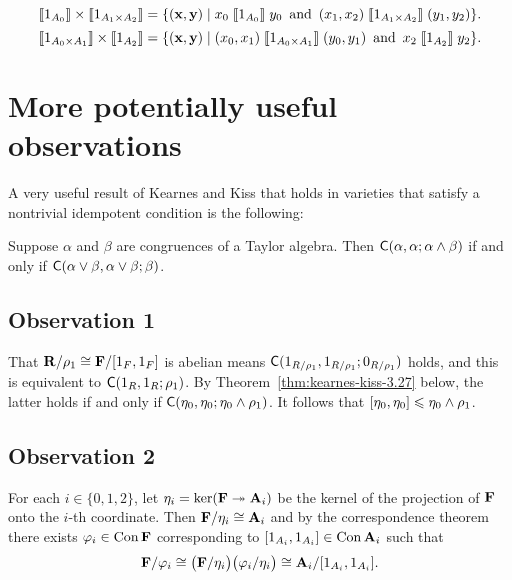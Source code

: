 \medskip

\[
\llbracket 1_{A_0} \rrbracket \times \llbracket 1_{A_1\times A_2} \rrbracket = 
\{(\mathbf{x}, \mathbf{y}) \mid x_0 \mathrel{\llbracket 1_{A_0} \rrbracket} y_0 \, \text{ and } \, 
(x_1, x_2) \mathrel{\llbracket 1_{A_1\times A_2} \rrbracket} (y_1, y_2)\}.
\]
\[
\llbracket 1_{A_0\times A_1} \rrbracket \times\llbracket 1_{A_2} \rrbracket = 
\{(\mathbf{x}, \mathbf{y}) \mid  
(x_0, x_1) \mathrel{\llbracket 1_{A_0\times A_1} \rrbracket} (y_0, y_1)\, \text{ and } \, x_2 \mathrel{\llbracket 1_{A_2} \rrbracket} y_2 
\}.
\]

\bigskip

\bigskip

\section{More potentially useful observations}
A very useful result of Kearnes and Kiss that holds in varieties that satisfy a
nontrivial idempotent \malcev condition is the following:
\begin{theorem} 
  \label{thm:kearnes-kiss-3.27}
  Suppose $\alpha$ and $\beta$ are congruences of a Taylor algebra. Then
  $\mathsf{C}(\alpha,  \alpha;  \alpha \wedge \beta)$ if and only if
  $\mathsf{C}(\alpha \vee \beta,  \alpha \vee \beta;  \beta)$.
\end{theorem}

\subsection*{Observation 1}
That $\mathbf{R}/\rho_1 \cong \mathbf{F} /[1_{F},1_{F}]$ is abelian means
$\mathsf{C}(1_{R/\rho_1}, 1_{R/\rho_1}; 0_{R/\rho_1})$ holds, and this is equivalent to
$\mathsf{C}(1_R, 1_R; \rho_1)$. By Theorem~\ref{thm:kearnes-kiss-3.27} below, the latter
holds if and only if $\mathsf{C}(\eta_0, \eta_0; \eta_0\wedge \rho_1)$.
It follows that $[\eta_0, \eta_0]\leqslant \eta_0 \wedge \rho_1$.


\subsection*{Observation 2}
\renewcommand{\phi}{\ensuremath{\varphi}}
For each $i\in \{0,1,2\}$, let $\eta_i = \ker(\mathbf{F} \twoheadrightarrow \mathbf{A}_i)$ be the kernel of
the projection of $\mathbf{F}$ onto the $i$-th coordinate.  Then
$\mathbf{F}/\eta_i \cong \mathbf{A}_i$ and by the correspondence theorem there exists
$\phi_i\in \Con\bF$ corresponding to $[1_{A_i}, 1_{A_i}] \in \operatorname{Con} \mathbf{A}_i$
such that 
\[
\bF/\phi_i \cong
\bigl(\bF/\etaR_i\bigr)\bigl(\phi_i/\etaR_i\bigr)
\cong \bA_i/\com{1_{A_i}}.
\]

